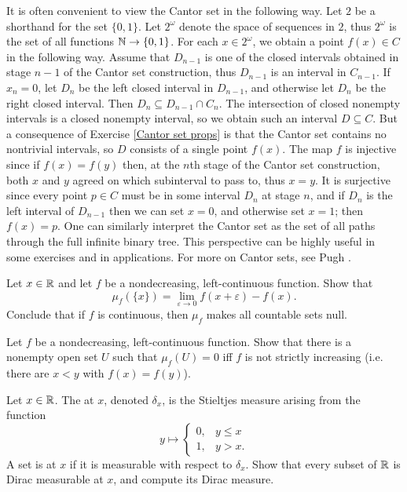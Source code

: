 \begin{subsec}
It is often convenient to view the Cantor set in the following way. Let $2$ be a shorthand for the set $\{0, 1\}$.
Let $2^\omega$ denote the space of sequences in $2$, thus $2^\omega$ is the set of all functions $\mathbb{N} \to \{0, 1\}$.
For each $x \in 2^\omega$, we obtain a point $f(x) \in C$ in the following way.
Assume that $D_{n-1}$ is one of the closed intervals obtained in stage $n-1$ of the Cantor set construction, thus $D_{n-1}$ is an interval in $C_{n-1}$.
If $x_n = 0$, let $D_n$ be the left closed interval in $D_{n-1}$, and otherwise let $D_n$ be the right closed interval.
Then $D_n \subseteq D_{n-1} \cap C_n$.
The intersection of closed nonempty intervals is a closed nonempty interval, so we obtain such an interval $D \subseteq C$.
But a consequence of Exercise \ref{Cantor set props} is that the Cantor set contains no nontrivial intervals, so $D$ consists of a single point $f(x)$.
The map $f$ is injective since if $f(x) = f(y)$ then, at the $n$th stage of the Cantor set construction, both $x$ and $y$ agreed on which subinterval to pass to, thus $x = y$.
It is surjective since every point $p \in C$ must be in some interval $D_n$ at stage $n$, and if $D_n$ is the left interval of $D_{n-1}$ then we can set $x = 0$, and otherwise set $x = 1$; then $f(x) = p$.
One can similarly interpret the Cantor set as the set of all paths through the full infinite binary tree.
This perspective can be highly useful in some exercises and in applications.
For more on Cantor sets, see Pugh \cite[Chapter 2]{pugh2013real}.
\end{subsec}

\begin{exercise}
Let $x \in \mathbb{R}$ and let $f$ be a nondecreasing, left-continuous function. Show that
\[\mu_f(\{x\}) = \lim_{\varepsilon \to 0} f(x+\varepsilon) - f(x).\]
Conclude that if $f$ is continuous, then $\mu_f$ makes all countable sets null.
\end{exercise}

\begin{exercise}
Let $f$ be a nondecreasing, left-continuous function. Show that there is a nonempty open set $U$ such that $\mu_f(U) = 0$ iff $f$ is not strictly increasing (i.e. there are $x < y$ with $f(x) = f(y)$).
\end{exercise}

\begin{exercise}
\label{Dirac measure}
Let $x \in \mathbb{R}$. The  at $x$, denoted $\delta_x$, is the Stieltjes measure arising from the function
$$y \mapsto \begin{cases}
0, &y \leq x\\
1, &y > x.
\end{cases}$$
A set is  at $x$ if it is measurable with respect to $\delta_x$.
Show that every subset of $\mathbb{R}$ is Dirac measurable at $x$, and compute its Dirac measure.
\end{exercise}

